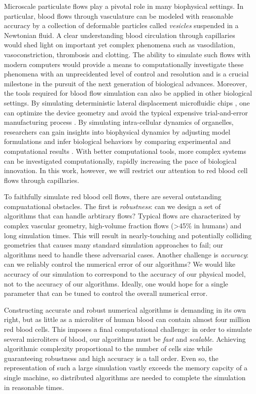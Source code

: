 
Microscale particulate flows play a pivotal role in many biophysical settings.
In particular, blood flows through vasculature can be modeled with reasonable accuracy by a collection of deformable particles called \textit{vesicles} suspended in a Newtonian fluid.
A clear understanding blood circulation through capillaries would shed light on important yet complex phenomena such as vasodilation, vasoconstriction, thrombosis and clotting.
The ability to simulate such flows with modern computers would provide a means to computationally investigate these phenomena with an unprecidented level of control and resolution and is a crucial milestone in the pursuit of the next generation of biological advances.
Moreover, the tools required for blood flow simulation can also be applied in other biological settings.
By simulating deterministic lateral displacement microfluidic chips , one can optimize the device geometry and avoid the typical expensive trial-and-error manufacturing process \cite{kabacaouglu2019sorting}.
By simulating intra-cellular dynamics of organelles, researchers can gain insights into biophysical dynamics by adjusting model formulations and infer biological behaviors by comparing experimental and computational results \cite{nazockdast2017cytoplasmic}. 
With better computational tools, more complex systems can be investigated computationally, rapidly increasing the pace of biological innovation.
In this work, however, we will restrict our attention to red blood cell flows through capillaries.

To faithfully simulate red blood cell flows, there are several outstanding compuatational obstacles.
The first is \textit{robustness}: can we design a set of algorithms that can handle arbtirary flows?
Typical flows are characterized by complex vascular geometry, high-volume fraction flows (>45\% in humans) and long simulation times. 
This will result in nearly-touching and potentially colliding geometries that causes many standard simulation approaches to fail; our algorithms need to handle these adversarial cases.
Another challenge is \textit{accuracy}: can we reliably control the numerical error of our algorithms?
We would like accuracy of our simulation to correspond to the accuracy of our physical model, not to the accuracy of our algorithms.
Ideally, one would hope for a single parameter that can be tuned to control the overall numerical error.

Constructing accurate and robust numerical algorithms is demanding in its own right, but as little as a microliter of human blood can contain almost four million red blood cells.
This imposes a final computational challenge: in order to simulate several microliters of blood, our algorithms must be \textit{fast} and \textit{scalable}.
Achieving algorithmic complexity proportional to the number of cells size while guaranteeing robustness and high accuracy is a tall order.
Even so, the representation of such a large simulation vastly exceeds the memory capcity of a single machine, so distributed algorithms are needed to complete the simulation in reasonable times.


